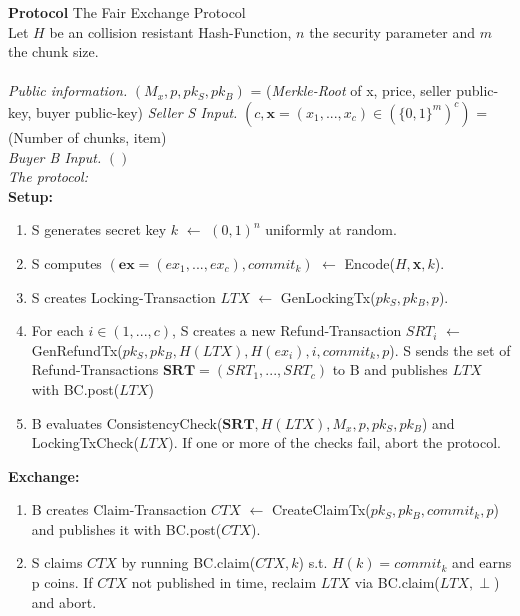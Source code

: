 \documentclass{cacthesis}
\makeatletter
\newcounter{protocol}
\newenvironment{protocol}[1]
  {\par\addvspace{\topsep}
   \noindent
   \tabularx{\linewidth}{@{} X @{}}
    \hline
    \refstepcounter{protocol}\textbf{Protocol \theprotocol} #1 \\
    \hline}
  { \\
    \hline
   \endtabularx
   \par\addvspace{\topsep}}
\newcommand{\sbline}{\\[.5\normalbaselineskip]}%
\makeatother
\begin{document}
        
        \begin{protocol}{The Fair Exchange Protocol}
        Let $H$ be an collision resistant Hash-Function, $n$ the security parameter and $m$ the chunk size. \\
        \sbline
        \textit{Public information.} $(M_x, p, pk_S, pk_B)$ = (\textit{Merkle-Root} of x, price, seller public-key, buyer public-key)
        \textit{Seller S Input.} $(c, \textbf{x} = (x_1, ..., x_c) \in (\{0,1\}^m)^c)$ = (Number of chunks, item)
        \sbline
        \textit{Buyer B Input.} $()$
        \sbline
        \textit{The protocol:}
        \sbline
        \textbf{Setup:}
          \begin{enumerate}
            \item S generates secret key $k$ $\leftarrow$ $(0, 1)^n$ uniformly at random.
            
            \item S computes $(\textbf{ex} = (ex_1, ..., ex_c), commit_k)$ $\leftarrow$ \textsf{Encode($H, $}\textbf{x}\textsf{$, k$)}.
            
            \item S creates Locking-Transaction $LTX$ $\leftarrow$ \textsf{GenLockingTx($pk_S, pk_B, p$)}.
            
            \item For each $i \in (1, ..., c)$, S creates a new Refund-Transaction $SRT_i$ $\leftarrow$ \textsf{GenRefundTx($pk_S, pk_B, H(LTX), H(ex_i), i, commit_k, p$)}. S sends the set of Refund-Transactions $\textbf{SRT} = (SRT_1, ..., SRT_c)$ to B and publishes $LTX$ with \textsf{BC.post($LTX$)}
            
            \item B evaluates \textsf{ConsistencyCheck(}$\textbf{SRT}$\textsf{$, H(LTX), M_x, p, pk_S, pk_B$)} and \textsf{LockingTxCheck($LTX$)}. If one or more of the checks fail, abort the protocol.
          \end{enumerate}
          
          \textbf{Exchange:}
          \begin{enumerate}
            \item B creates Claim-Transaction $CTX$ $\leftarrow$ \textsf{CreateClaimTx($pk_S, pk_B, commit_k, p$)} and publishes it with \textsf{BC.post($CTX$)}.
            
            \item S claims $CTX$ by running \textsf{BC.claim($CTX, k$)} s.t. $H(k) = commit_k$ and earns p coins. If $CTX$ not published in time, reclaim $LTX$ via \textsf{BC.claim($LTX, \perp$)} and abort. 
          \end{enumerate}
          

\end{protocol}
\end{document}
